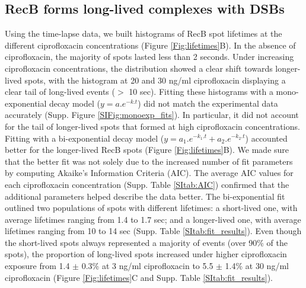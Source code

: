 \subsection*{RecB forms long-lived complexes with DSBs}
Using the time-lapse data, we built histograms of RecB spot lifetimes at the different ciprofloxacin concentrations (Figure \ref{Fig:lifetimes}B). In the absence of ciprofloxacin, the majority of spots lasted less than 2 seconds. Under increasing ciprofloxacin concentrations, the distribution showed a clear shift towards longer-lived spots, with the histogram at 20 and 30 ng/ml ciprofloxacin displaying a clear tail of long-lived events ($>$ 10 sec). Fitting these histograms with a mono-exponential decay model ($y = a.e^{-k.t}$) did not match the experimental data accurately (Supp. Figure \ref{SIFig:monoexp_fits}). In particular, it did not account for the tail of longer-lived spots that formed at high ciprofloxacin concentrations. Fitting with a bi-exponential decay model ($y = a_1.e^{-k_1.t} + a_2.e^{-k_2.t}$) accounted better for the longer-lived RecB spots (Figure \ref{Fig:lifetimes}B). We made sure that the better fit was not solely due to the increased number of fit parameters by computing Akaike's Information Criteria (AIC). The average AIC values for each ciprofloxacin concentration (Supp. Table \ref{SItab:AIC}) confirmed that the additional parameters helped describe the data better. The bi-exponential fit outlined two populations of spots with different lifetimes: a short-lived one, with average lifetimes ranging from 1.4 to 1.7 sec; and a longer-lived one, with average lifetimes ranging from 10 to 14 sec (Supp. Table \ref{SItab:fit_results}). Even though the short-lived spots always represented a majority of events (over 90\% of the spots), the proportion of long-lived spots increased under higher ciprofloxacin exposure from 1.4 $\pm$ 0.3\% at 3 ng/ml ciprofloxacin to 5.5 $\pm$ 1.4\% at 30 ng/ml ciprofloxacin (Figure \ref{Fig:lifetimes}C and Supp. Table \ref{SItab:fit_results}).


